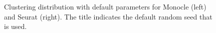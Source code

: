 \begin{figure}[H]
    \centering
    \caption{\label{fig:ca-1-knpart}Clustering distribution with default parameters for Monocle (left) and Seurat (right). The title indicates the default random seed that is used.}
\end{figure}

